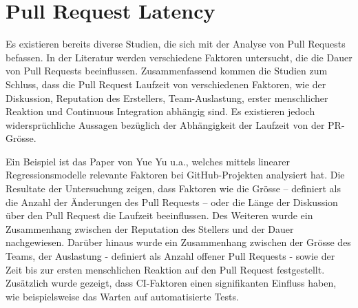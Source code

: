 \section{Pull Request Latency}
\label{sec:PullRequestDauer}
Es existieren bereits diverse Studien, die sich mit der Analyse von Pull Requests befassen. In der Literatur werden verschiedene Faktoren untersucht, die die Dauer von Pull Requests beeinflussen. Zusammenfassend kommen die Studien zum Schluss, dass die Pull Request Laufzeit von verschiedenen Faktoren, wie der Diskussion, Reputation des Erstellers, Team-Auslastung, erster menschlicher Reaktion und Continuous Integration abhängig sind. Es existieren jedoch widersprüchliche Aussagen bezüglich der Abhängigkeit der Laufzeit von der PR-Grösse. \parencite{yu_wait_2015}\parencite{hasan_understanding_2023}\parencite{kudrjavets_small_2022}\parencite{bernardo_studying_2018}

Ein Beispiel ist das Paper von Yue Yu u.a.\parencite{yu_wait_2015}, welches  mittels linearer Regressionsmodelle relevante Faktoren bei GitHub-Projekten analysiert hat. Die Resultate der Untersuchung zeigen, dass Faktoren wie die Grösse – definiert als die Anzahl der Änderungen des Pull Requests – oder die Länge der Diskussion über den Pull Request die Laufzeit beeinflussen. Des Weiteren wurde ein Zusammenhang zwischen der Reputation des Stellers und der Dauer nachgewiesen. Darüber hinaus wurde ein Zusammenhang zwischen der Grösse des Teams, der Auslastung - definiert als Anzahl offener Pull Requests - sowie der Zeit bis zur ersten menschlichen Reaktion auf den Pull Request festgestellt. Zusätzlich wurde gezeigt, dass CI-Faktoren einen signifikanten Einfluss haben, wie beispielsweise das Warten auf automatisierte Tests.~\parencite{yu_wait_2015}

